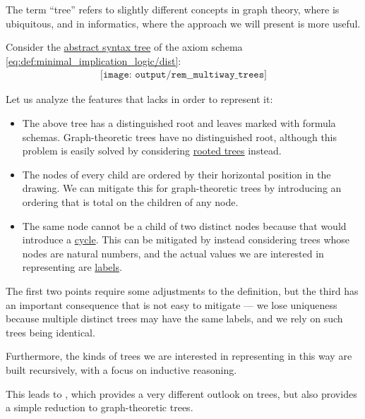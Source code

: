 \begin{remark}\label{rem:multiway_trees}
  The term \enquote{tree} refers to slightly different concepts in graph theory, where  is ubiquitous, and in informatics, where the approach we will present is more useful.

  Consider the \hyperref[con:abstract_syntax_tree]{abstract syntax tree} of the axiom schema \eqref{eq:def:minimal_implication_logic/dist}:
  \begin{equation}\label{eq:rem:multiway_trees/dist}
    \begin{aligned}
      \texttt{[image: output/rem\_\_multiway\_trees]}
    \end{aligned}
  \end{equation}

  Let us analyze the features that  lacks in order to represent it:
  \begin{itemize}
    \item The above tree has a distinguished root and leaves marked with formula schemas. Graph-theoretic trees have no distinguished root, although this problem is easily solved by considering \hyperref[def:rooted_tree]{rooted trees} instead.
    \item The nodes of every child are ordered by their horizontal position in the drawing. We can mitigate this for graph-theoretic trees by introducing an ordering that is total on the children of any node.
    \item The same node cannot be a child of two distinct nodes because that would introduce a \hyperref[def:graph_cycle]{cycle}. This can be mitigated by instead considering trees whose nodes are natural numbers, and the actual values we are interested in representing are \hyperref[def:labeled_set]{labels}.
  \end{itemize}

  The first two points require some adjustments to the definition, but the third has an important consequence that is not easy to mitigate --- we lose uniqueness because multiple distinct trees may have the same labels, and we rely on such trees being identical.

  Furthermore, the kinds of trees we are interested in representing in this way are built recursively, with a focus on inductive reasoning.

  This leads to , which provides a very different outlook on trees, but also provides a simple reduction to graph-theoretic trees.
\end{remark}

